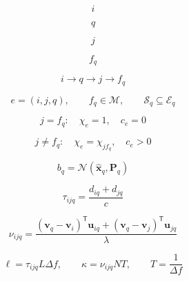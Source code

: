 \documentclass[12pt]{article}
\begin{document}
\color{ink}
\begin{equation*}\displaystyle i\end{equation*}

\begin{equation*}\displaystyle q\end{equation*}

\begin{equation*}\displaystyle j\end{equation*}

\begin{equation*}\displaystyle f_q\end{equation*}

\begin{equation*}\displaystyle i\longrightarrow q\longrightarrow j\longrightarrow f_q\end{equation*}

\begin{equation*}\displaystyle e=(i,j,q),\qquad f_q\in\mathcal M,\qquad\mathcal S_q\subseteq\mathcal E_q\end{equation*}

\begin{equation*}\displaystyle j=f_q:\quad\chi_e=1,\quad c_e=0\end{equation*}

\begin{equation*}\displaystyle j\ne f_q:\quad\chi_e=\chi_{j f_q},\quad c_e>0\end{equation*}

\begin{equation*}\displaystyle b_q=\mathcal N\!\left(\widehat{\mathbf x}_q,\mathbf P_q\right)\end{equation*}

\begin{equation*}\displaystyle \tau_{ijq}=\frac{d_{iq}+d_{jq}}{c}\end{equation*}

\begin{equation*}\displaystyle \nu_{ijq}=\frac{(\mathbf v_q-\mathbf v_i)^\mathsf T\mathbf u_{iq}+(\mathbf v_q-\mathbf v_j)^\mathsf T\mathbf u_{jq}}{\lambda}\end{equation*}

\begin{equation*}\displaystyle \ell=\tau_{ijq}L\Delta f,\qquad\kappa=\nu_{ijq}NT,\qquad T=\frac1{\Delta f}\end{equation*}
\end{document}
